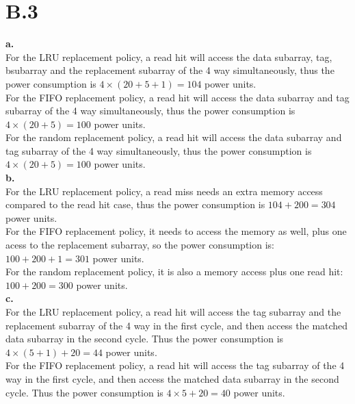 \documentclass{article}
\begin{document}
\section{B.3}

\noindent\indent \textbf{a.}\\
\indent For the LRU replacement policy, a read hit will access the data subarray, tag, bsubarray and the replacement subarray of the 4 way simultaneously, thus the power consumption is $4\times(20+5+1)=104$ power units.\\

For the FIFO replacement policy, a read hit will access the data subarray and tag subarray of the 4 way simultaneously, thus the power consumption is $4\times(20+5)=100$ power units.\\

For the random replacement policy, a read hit will access the data subarray and tag subarray of the 4 way simultaneously, thus the power consumption is $4\times(20+5)=100$ power units.\\

\noindent\textbf{b.}\\
\indent For the LRU replacement policy, a read miss needs an extra memory access compared to the read hit case, thus the power consumption is $104+200=304$ power units.\\

For the FIFO replacement policy, it needs to access the memory as well, plus one acess to the replacement subarray, so the power consumption is: $100+200+1=301$ power units.\\

For the random replacement policy, it is also a memory access plus one read hit: $100+200=300$ power units.\\

\noindent\textbf{c.}\\
\indent For the LRU replacement policy, a read hit will access the tag subarray and the replacement subarray of the 4 way in the first cycle, and then access the matched data subarray in the second cycle. Thus the power consumption is $4\times(5+1)+20=44$ power units.\\

For the FIFO replacement policy, a read hit will access the tag subarray of the 4 way in the first cycle, and then access the matched data subarray in the second cycle. Thus the power consumption is $4\times5+20=40$ power units.\\
\end{document}
